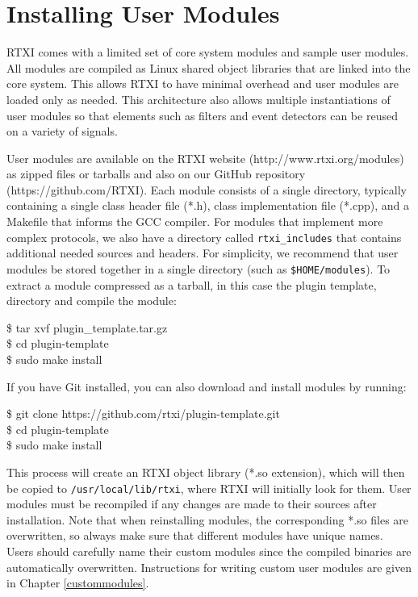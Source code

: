 \section{Installing User Modules}
\label{module installation}  
RTXI comes with a limited set of core system modules and sample user modules. All modules are compiled as Linux shared object libraries that are linked into the core system. This allows RTXI to have minimal overhead and user modules are loaded only as needed. This architecture also allows multiple instantiations of user modules so that elements such as filters and event detectors can be reused on a variety of signals. 

User modules are available on the RTXI website (http://www.rtxi.org/modules) as zipped files or tarballs and also on our GitHub repository (https://github.com/RTXI). Each module consists of a single directory, typically containing a single class header file (*.h), class implementation file (*.cpp), and a Makefile that informs the GCC compiler. For modules that implement more complex protocols, we also have a directory called \texttt{rtxi\_includes} that contains additional needed sources and headers. For simplicity, we recommend that user modules be stored together in a single directory (such as \texttt{\$HOME/modules}). To extract a module compressed as a tarball, in this case the plugin template, directory and compile the module:
\begin{example}
\$ tar xvf plugin\_template.tar.gz\\
\$ cd plugin-template\\
\$ sudo make install
\end{example}

If you have Git installed, you can also download and install modules by running:
\begin{example}
\$ git clone https://github.com/rtxi/plugin-template.git\\
\$ cd plugin-template\\
\$ sudo make install\\
\end{example}

This process will create an RTXI object library (*.so extension), which will then be copied to \texttt{/usr/local/lib/rtxi}, where RTXI will initially look for them. User modules must be recompiled if any changes are made to their sources after installation. Note that when reinstalling modules, the corresponding *.so files are overwritten, so always make sure that different modules have unique names. Users should carefully name their custom modules since the compiled binaries are automatically overwritten. Instructions for writing custom user modules are given in Chapter \ref{custommodules}.